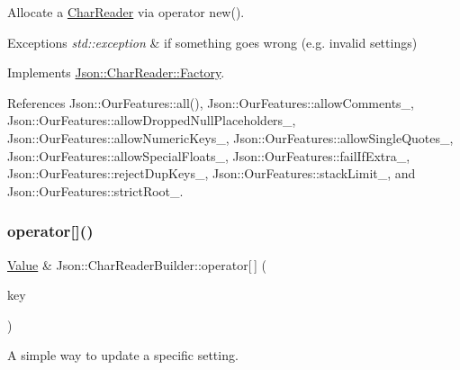 Allocate a \hyperlink{classJson_1_1CharReader}{Char\+Reader} via operator new(). 


\begin{DoxyExceptions}{Exceptions}
{\em std\+::exception} & if something goes wrong (e.\+g. invalid settings) \\
\hline
\end{DoxyExceptions}


Implements \hyperlink{classJson_1_1CharReader_1_1Factory_a4c5862a1ffd432372dbe65cf59de98c4_a4c5862a1ffd432372dbe65cf59de98c4}{Json\+::\+Char\+Reader\+::\+Factory}.



References Json\+::\+Our\+Features\+::all(), Json\+::\+Our\+Features\+::allow\+Comments\+\_\+, Json\+::\+Our\+Features\+::allow\+Dropped\+Null\+Placeholders\+\_\+, Json\+::\+Our\+Features\+::allow\+Numeric\+Keys\+\_\+, Json\+::\+Our\+Features\+::allow\+Single\+Quotes\+\_\+, Json\+::\+Our\+Features\+::allow\+Special\+Floats\+\_\+, Json\+::\+Our\+Features\+::fail\+If\+Extra\+\_\+, Json\+::\+Our\+Features\+::reject\+Dup\+Keys\+\_\+, Json\+::\+Our\+Features\+::stack\+Limit\+\_\+, and Json\+::\+Our\+Features\+::strict\+Root\+\_\+.

\mbox{\label{classJson_1_1CharReaderBuilder_a84b35ef443340c06c0aa7b47851d8d86_a84b35ef443340c06c0aa7b47851d8d86}} 
\subsubsection{\texorpdfstring{operator[]()}{operator[]()}}
{\footnotesize\ttfamily \hyperlink{classJson_1_1Value}{Value} \& Json\+::\+Char\+Reader\+Builder\+::operator\mbox{[}$\,$\mbox{]} (\begin{DoxyParamCaption}\item[{\hyperlink{json_8h_a1e723f95759de062585bc4a8fd3fa4be_a1e723f95759de062585bc4a8fd3fa4be}{J\+S\+O\+N\+C\+P\+P\+\_\+\+S\+T\+R\+I\+NG}}]{key }\end{DoxyParamCaption})}

A simple way to update a specific setting. \mbox{\label{classJson_1_1CharReaderBuilder_a03ff031e06aabff989ab4addc87294ab_a03ff031e06aabff989ab4addc87294ab}} 
